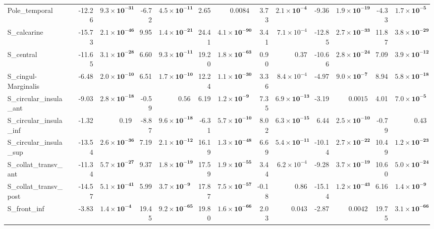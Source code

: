 {\begin{longtable}{llrrrrrrrrrrrr}
Pole\_temporal &  & -12.26 & $\mathbf{9.3{\times}10^{-31}}$ & -6.72 & $\mathbf{4.5{\times}10^{-11}}$ & 2.65 & $0.0084$ & 3.73 & $\mathbf{2.1{\times}10^{-4}}$ & -9.36 & $\mathbf{1.9{\times}10^{-19}}$ & -4.33 & $\mathbf{1.7{\times}10^{-5}}$ \\
S\_calcarine &  & -15.73 & $\mathbf{2.1{\times}10^{-46}}$ & 9.95 & $\mathbf{1.4{\times}10^{-21}}$ & 24.41 & $\mathbf{4.1{\times}10^{-90}}$ & 3.41 & $7.1{\times}10^{-4}$ & -12.85 & $\mathbf{2.7{\times}10^{-33}}$ & 11.87 & $\mathbf{3.8{\times}10^{-29}}$ \\
S\_central &  & -11.65 & $\mathbf{3.1{\times}10^{-28}}$ & 6.60 & $\mathbf{9.3{\times}10^{-11}}$ & 19.20 & $\mathbf{1.8{\times}10^{-63}}$ & 0.90 & $0.37$ & -10.66 & $\mathbf{2.8{\times}10^{-24}}$ & 7.09 & $\mathbf{3.9{\times}10^{-12}}$ \\
S\_cingul-Marginalis &  & -6.48 & $\mathbf{2.0{\times}10^{-10}}$ & 6.51 & $\mathbf{1.7{\times}10^{-10}}$ & 12.24 & $\mathbf{1.1{\times}10^{-30}}$ & 3.36 & $8.4{\times}10^{-4}$ & -4.97 & $\mathbf{9.0{\times}10^{-7}}$ & 8.94 & $\mathbf{5.8{\times}10^{-18}}$ \\
S\_circular\_insula\_ant &  & -9.03 & $\mathbf{2.8{\times}10^{-18}}$ & -0.59 & $0.56$ & 6.19 & $\mathbf{1.2{\times}10^{-9}}$ & 7.35 & $\mathbf{6.9{\times}10^{-13}}$ & -3.19 & $0.0015$ & 4.01 & $\mathbf{7.0{\times}10^{-5}}$ \\
S\_circular\_insula\_inf &  & -1.32 & $0.19$ & -8.87 & $\mathbf{9.6{\times}10^{-18}}$ & -6.31 & $\mathbf{5.7{\times}10^{-10}}$ & 8.02 & $\mathbf{6.3{\times}10^{-15}}$ & 6.44 & $\mathbf{2.5{\times}10^{-10}}$ & -0.79 & $0.43$ \\
S\_circular\_insula\_sup &  & -13.54 & $\mathbf{2.6{\times}10^{-36}}$ & 7.19 & $\mathbf{2.1{\times}10^{-12}}$ & 16.19 & $\mathbf{1.3{\times}10^{-48}}$ & 6.69 & $\mathbf{5.4{\times}10^{-11}}$ & -10.14 & $\mathbf{2.7{\times}10^{-22}}$ & 10.49 & $\mathbf{1.2{\times}10^{-23}}$ \\
S\_collat\_transv\_ant &  & -11.34 & $\mathbf{5.7{\times}10^{-27}}$ & 9.37 & $\mathbf{1.8{\times}10^{-19}}$ & 17.59 & $\mathbf{1.9{\times}10^{-55}}$ & 3.44 & $6.2{\times}10^{-4}$ & -9.28 & $\mathbf{3.7{\times}10^{-19}}$ & 10.60 & $\mathbf{5.0{\times}10^{-24}}$ \\
S\_collat\_transv\_post &  & -14.57 & $\mathbf{5.1{\times}10^{-41}}$ & 5.99 & $\mathbf{3.7{\times}10^{-9}}$ & 17.87 & $\mathbf{7.5{\times}10^{-57}}$ & -0.18 & $0.86$ & -15.14 & $\mathbf{1.2{\times}10^{-43}}$ & 6.16 & $\mathbf{1.4{\times}10^{-9}}$ \\
S\_front\_inf &  & -3.83 & $\mathbf{1.4{\times}10^{-4}}$ & 19.45 & $\mathbf{9.2{\times}10^{-65}}$ & 19.80 & $\mathbf{1.6{\times}10^{-66}}$ & 2.03 & $0.043$ & -2.87 & $0.0042$ & 19.75 & $\mathbf{3.1{\times}10^{-66}}$ \\

\end{longtable}}
